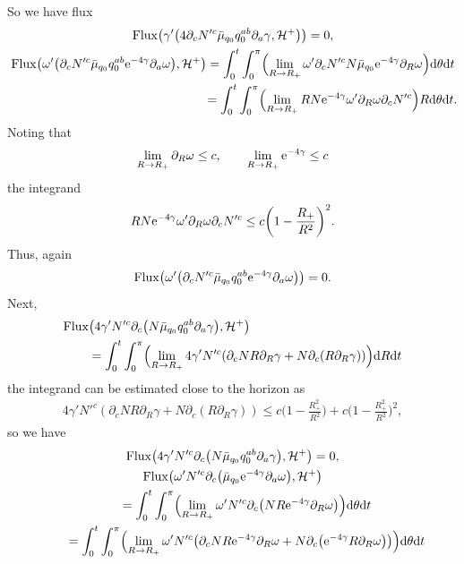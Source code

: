\documentclass[11pt]{article}
\numberwithin{equation}{section}
\def\ptl{\partial}%
\numberwithin{equation}{section}
\begin{document}
So we have flux
\begin{gather*}
{\rm Flux} \bigl(\gamma' \bigl(4 \ptl_c N'^c \bar{\mu}_{q_0} q^{ab} _0 \ptl_a \gamma, \mathcal{H}^+\bigr)\bigr) =0,
\\
{\rm Flux} \bigl(\omega' \bigl(\ptl_c N'^c \bar{\mu}_{q_0} q^{ab} _0 {\rm e}^{-4 \gamma} \ptl_a \omega\bigr), \mathcal{H}^+\bigr)
= \int^t_0 \int^\pi_0 \Bigl(\lim_{R \to R_+} \omega' \ptl_c N'^c N \bar{\mu}_{q_0} {\rm e}^{-4\gamma} \ptl_R \omega\Bigr) {\rm d} \theta {\rm d}t \notag\\
\hphantom{{\rm Flux} \bigl(\omega' \bigl(\ptl_c N'^c \bar{\mu}_{q_0} q^{ab} _0 {\rm e}^{-4 \gamma} \ptl_a \omega\bigr), \mathcal{H}^+\bigr)}{}
= \int^t_0 \int^\pi_0 \Bigl(\lim_{R \to R_+} R N {\rm e}^{-4\gamma} \omega' \ptl_R \omega \ptl_c N'^c\Bigr)R {\rm d}\theta {\rm d}t.
\end{gather*}
Noting that
\begin{align*}
\lim_{R \to R_+} \ptl_R \omega \leq c, \qquad \lim_{R \to R_+} {\rm e}^{-4\gamma} \leq c
\end{align*}
the integrand
\begin{align*}
R N {\rm e}^{-4\gamma} \omega' \ptl_R \omega \ptl_c N'^c \leq c \biggl(1- \frac{R_+}{R^2}\biggr)^2.
\end{align*}
Thus, again
\begin{align*}
{\rm Flux} \bigl(\omega' \bigl(\ptl_c N'^c \bar{\mu}_{q_0} q^{ab} _0 {\rm e}^{-4 \gamma} \ptl_a \omega\bigr)\bigr) =0.
\end{align*}
Next,
\begin{align*}
& {\rm Flux} \bigl(4\gamma' N'^c\ptl_c \bigl(N \bar{\mu}_{q_0} q^{ab}_0 \ptl_a \gamma\bigr), \mathcal{H}^+\bigr) \notag \\
&\qquad{}= \int^t_0 \int^\pi_0 \Bigl(\lim_{R \to R_+} 4 \gamma' N'^c (\ptl_c N R \ptl_R \gamma + N \ptl_c (R \ptl_R \gamma) ) \Bigr) {\rm d}R {\rm d}t
\end{align*}
the integrand can be estimated close to the horizon as
\begin{align*}
4 \gamma' N'^c (\ptl_c N R \ptl_R \gamma + N \ptl_c (R \ptl_R \gamma) ) \leq c \biggl(1- \frac{R^2_+}{R^2}\biggr) + c \biggl(1- \frac{R^2_+}{R^2}\biggr)^2,
\end{align*}
so we have
\begin{gather*}
{\rm Flux} \bigl(4\gamma' N'^c\ptl_c \bigl(N \bar{\mu}_{q_0} q^{ab}_0 \ptl_a \gamma\bigr), \mathcal{H}^+\bigr) =0,
\\
{\rm Flux} \bigl(\omega' N'^c \ptl_c \bigl(\bar{\mu}_{q_0} {\rm e}^{-4\gamma} \ptl_a \omega\bigr), \mathcal{H}^+\bigr) \notag\\
\qquad{}=
\int^t_0 \int^\pi_0 \Bigl(\lim_{R \to R_+} \omega' N'^c \ptl_c\bigl(N R {\rm e}^{-4\gamma} \ptl_R \omega\bigr) \Bigr) {\rm d}\theta {\rm d}t \notag\\
\qquad{}= \int^t_0 \int^\pi_0 \Bigl(\lim_{R \to R_+} \omega' N'^c \bigl(\ptl_c N R {\rm e}^{-4\gamma} \ptl_R \omega + N \ptl_c \bigl({\rm e}^{-4\gamma} R \ptl_R \omega\bigr)\bigr) \Bigr) {\rm d} \theta {\rm d}t
\end{gather*}
\end{document}
